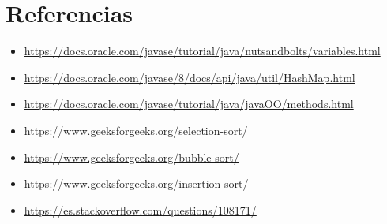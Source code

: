 \documentclass{article}
\begin{document}
\clearpage


\section{Referencias}
\begin{itemize}			
    \item \url{https://docs.oracle.com/javase/tutorial/java/nutsandbolts/variables.html}
    \item \url{https://docs.oracle.com/javase/8/docs/api/java/util/HashMap.html}
    \item \url{https://docs.oracle.com/javase/tutorial/java/javaOO/methods.html}
    \item \url{https://www.geeksforgeeks.org/selection-sort/}
    \item \url{https://www.geeksforgeeks.org/bubble-sort/}
    \item \url{https://www.geeksforgeeks.org/insertion-sort/}
    \item \url{https://es.stackoverflow.com/questions/108171/}
\end{itemize}	
	
%
%
%
			
\end{document}
